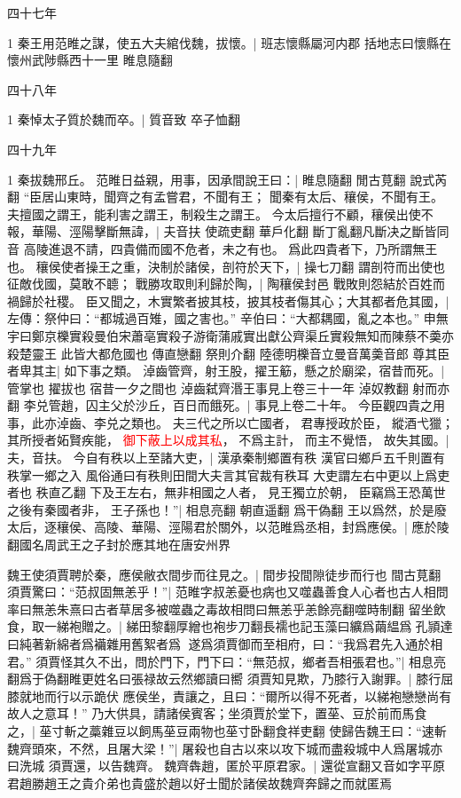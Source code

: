 四十七年

1 秦王用范睢之謀，使五大夫綰伐魏，拔懷。|{
	班志懷縣屬河内郡
	括地志曰懷縣在懷州武陟縣西十一里
	睢息隨翻
	}


四十八年


1 秦悼太子質於魏而卒。|{
	質音致
	卒子恤翻
	}


四十九年

1 秦拔魏邢丘。
范睢日益親，用事，因承間說王曰：|{
	睢息隨翻
	閒古莧翻
	說式芮翻
	}
“臣居山東時，聞齊之有孟嘗君，不聞有王；
聞秦有太后、穰侯，不聞有王。
夫擅國之謂王，能利害之謂王，制殺生之謂王。
今太后擅行不顧，穰侯出使不報，華陽、涇陽擊斷無諱，|{
	夫音扶
	使疏吏翻
	華戶化翻
	斷丁亂翻凡斷决之斷皆同音
	}
高陵進退不請，四貴備而國不危者，未之有也。
爲此四貴者下，乃所謂無王也。
穰侯使者操王之重，決制於諸侯，剖符於天下，|{
	操七刀翻
	謂剖符而出使也}
征敵伐國，莫敢不聼；
戰勝攻取則利歸於陶，|{
	陶穰侯封邑}
戰敗則怨結於百姓而禍歸於社稷。
臣又聞之，木實繁者披其枝，披其枝者傷其心；大其都者危其國，|{
	左傳：祭仲曰：“都城過百雉，國之害也。”
	辛伯曰：“大都耦國，亂之本也。”
	申無宇曰鄭京櫟實殺曼伯宋蕭亳實殺子游衛蒲戚實出獻公齊渠丘實殺無知而陳蔡不羮亦殺楚靈王
	此皆大都危國也
	傳直戀翻
	祭則介翻
	陸德明櫟音立曼音萬羮音郎}
尊其臣者卑其主|{
	如下事之類。
	}
淖齒管齊，射王股，擢王䈥，懸之於廟梁，宿昔而死。|{
	管掌也
	擢拔也
	宿昔一夕之間也
	淖齒弑齊湣王事見上卷三十一年
	淖奴教翻
	射而亦翻
	}
李兑管趙，囚主父於沙丘，百日而餓死。|{
	事見上卷二十年。
	}
今臣觀四貴之用事，此亦淖齒、李兑之類也。
夫三代之所以亡國者，
君專授政於臣，
縱酒弋獵；
其所授者妬賢疾能，
\textcolor{red}{御下蔽上以成其私}，
不爲主計，
而主不覺悟，
故失其國。|{
	夫，音扶。
	}
今自有秩以上至諸大吏，|{
	漢承秦制鄉置有秩
	漢官曰鄉戶五千則置有秩掌一鄉之入
	風俗通曰有秩則田間大夫言其官裁有秩耳
	大吏謂左右中更以上爲吏者也
	秩直乙翻
	}
下及王左右，無非相國之人者，
見王獨立於朝，
臣竊爲王恐萬世之後有秦國者非，
王子孫也！”|{
	相息亮翻
	朝直遥翻
	爲干偽翻
	}
王以爲然，於是廢太后，逐穰侯、高陵、華陽、涇陽君於關外，以范睢爲丞相，封爲應侯。|{
	應於陵翻國名周武王之子封於應其地在唐安州界
	}
	
魏王使須賈聘於秦，應侯敝衣間步而往見之。|{
	間步投間隙徒步而行也
	間古莧翻
	}
須賈驚曰：“范叔固無恙乎！”|{
	范睢字叔恙憂也病也又噬蟲善食人心者也古人相問率曰無恙朱熹曰古者草居多被噬蟲之毒故相問曰無恙乎恙餘亮翻噬時制翻}
留坐飲食，取一綈袍贈之。|{
	綈田黎翻厚繒也袍步刀翻長襦也記玉藻曰纊爲繭緼爲孔頴達曰純著新綿者爲襺雜用舊絮者爲}
遂爲須賈御而至相府，曰：“我爲君先入通於相君。”
須賈怪其久不出，問於門下，門下曰：“無范叔，鄉者吾相張君也。”|{
	相息亮翻爲于偽翻睢更姓名曰張禄故云然鄉讀曰嚮}
須賈知見欺，乃膝行入謝罪。|{
	膝行屈膝就地而行以示跪伏
	}
應侯坐，責讓之，且曰：“爾所以得不死者，以綈袍戀戀尚有故人之意耳！”
乃大供具，請諸侯賓客；坐須賈於堂下，置莝、豆於前而馬食之，|{
	莝寸斬之藁雜豆以飼馬莝豆兩物也莝寸卧翻食祥吏翻}
使歸告魏王曰：“速斬魏齊頭來，不然，且屠大梁！”|{
	屠殺也自古以來以攻下城而盡殺城中人爲屠城亦曰洗城}
須賈還，以告魏齊。
魏齊犇趙，匿於平原君家。|{
	還從宣翻又音如字平原君趙勝趙王之貴介弟也貴盛於趙以好士聞於諸侯故魏齊奔歸之而就匿焉}

